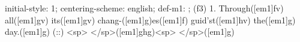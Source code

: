 initial-style: 1;
centering-scheme: english;
def-m1: \grealign;
(f3) 1. Through([em1]fv) all([em1]gv) its([em1]gv) chang-([em1]g)es([em1]f) guid'st([em1]hv) the([em1]g) day.([em1]g) (::) <sp> </sp>([em1]ghg)<sp> </sp>([em1]g)